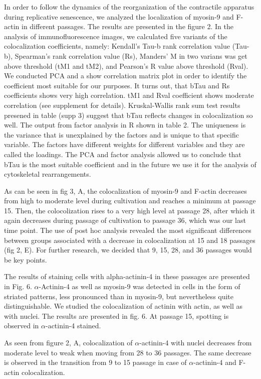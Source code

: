 \documentclass[alpha-refs]{wiley-article}
\begin{document}
In order to follow the dynamics of the reorganization of the contractile apparatus during replicative senescence, we analyzed the localization of myosin-9 and F-actin in different passages.
The results are presented in the figure 2.
In the analysis of immunofluorescence images, we calculated five variants of the colocalization coefficients, namely: Kendall's Tau-b rank correlation value (Tau-b), Spearman's rank correlation value (Rs), Manders' M in two varians was get above threshold (tM1 and tM2), and Pearson's R value above threshold (Rval).
We conducted PCA and a show correlation matrix plot in order to identify the coefficient most suitable for our purposes.
It turns out, that bTau and Rs coefficients shows very high correlation.
tM1 and Rval coefficient shows moderate correlation (see supplement for details).
Kruskal-Wallis rank sum test results presened in table (supp 3) suggest that bTau reflects changes in colocalization so well.
The output from factor analysis in R shown in table 2.
The uniqueness is the variance that is unexplained by the factors and is unique to that specific variable.
The factors have different weights for different variables and they are called the loadings.
The PCA and factor analysis allowed us to conclude that bTau is the most suitable coefficient and in the future we use it for the analysis of cytoskeletal rearrangements.


As can be seen in fig 3, A, the colocalization of myosin-9 and F-actin decreases from high to moderate level during cultivation and reaches a minimum at passage 15.
Then, the colocolization rises to a very high level at passage 28, after which it again decreases during passage of cultivation to passage 36, which was our last time point.
The use of post hoc analysis revealed the most significant differences between groups associated with a decrease in colocalization at 15 and 18 passages (fig 2, E).
For further research, we decided that 9, 15, 28, and 36 passages would be key points.


The results of staining cells with alpha-actinin-4 in these passages are presented in Fig. 6.
$\alpha$-Actinin-4 as well as myosin-9 was detected in cells in the form of striated patterns, less pronounced than in myosin-9, but nevertheless quite distinguishable.
We studied the colocalization of actinin with actin, as well as with nuclei.
The results are presented in fig. 6.
At passage 15, spotting is observed in $\alpha$-actinin-4 stained.


As seen from figure 2, A, colocalization of $\alpha$-actinin-4 with nuclei decreases from moderate level to weak when moving from 28 to 36 passages.
The same decrease is observed in the transition from 9 to 15 passage in case of $\alpha$-actinin-4 and F-actin colocalization.
\end{document}
